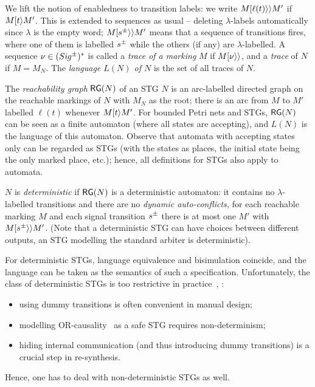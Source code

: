 \smallskip


We lift the notion of enabledness to transition labels: we write
$M[\ell(t)\rangle\rangle  M'$ if $M[t\rangle  M'$. This is extended to sequences
as usual -- deleting $\lambda$-labels automatically since $\lambda$
is the empty word; \ie $M[s^\pm\rangle\rangle M'$ means that a sequence of
transitions fires, where one of them is labelled $s^\pm$ while the
others (if any) are $\lambda$-labelled. A sequence
$\nu\in(\Sig\upd)^*$ is called a \emph{trace of a marking} $M$ if
$M[\nu\rangle\rangle$, and a \emph{trace} of $N$ if $M=M_N$. The \emph{language $L(N)$
of $N$} is the set of all traces of $N$.

\smallskip

The \emph{reachability graph} $\mathsf{RG}(N)$ of an STG $N$ is an arc-labelled
directed graph on the reachable markings of $N$ with $M_N$ as the root;
there is an arc from $M$ to $M'$ labelled $\ell(t)$ whenever
$M[t\rangle M'$. For bounded Petri nets and STGs, $\mathsf{RG}(N)$ can be seen as a finite automaton
(where all states are accepting), and $L(N)$ is the language of this
automaton.
Observe that automata with accepting states only can be
regarded as STGs (with the states as places, the initial state being the
only marked place, etc.); hence, all definitions for STGs also
apply to automata.

$N$ is \emph{deterministic} if $\mathsf{RG}(N)$
is a deterministic automaton: it contains no $\lambda$-labelled transitions
and there are no \emph{dynamic auto-conflicts,} \ie for each reachable marking $M$ and each signal transition $s^\pm$
there is at most one $M'$ with $M [s^\pm\rangle\rangle M'$. (Note that a deterministic STG
can have choices between different outputs, \eg an STG modelling
the standard arbiter is deterministic).

For deterministic STGs, language equivalence and bisimulation coincide, and the language can be taken as the semantics of such a specification. Unfortunately, the class of deterministic STGs is too restrictive in practice~\cite{KSV-08}, \eg:
\begin{itemize}
  \item using dummy transitions is often convenient in manual design;
  \item modelling OR-causality~\cite{ykklp96} as a safe STG requires non-determinism;
  \item hiding internal communication (and thus introducing dummy transitions) is a crucial step in re-synthesis.
\end{itemize}
Hence, one has to deal with non-deterministic STGs as well.

